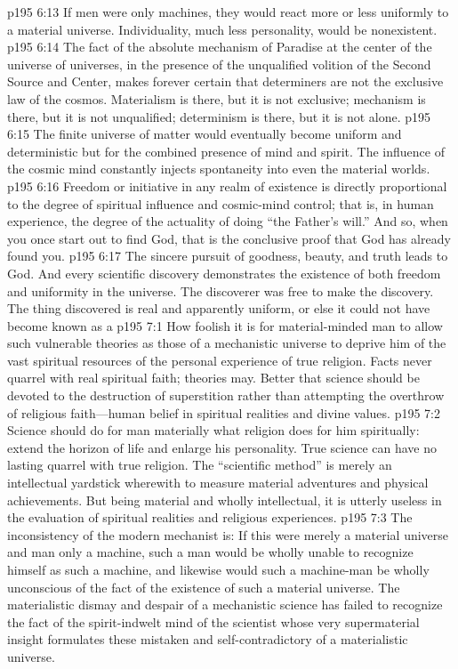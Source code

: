 \vs p195 6:13 If men were only machines, they would react more or less uniformly to a material universe. Individuality, much less personality, would be nonexistent.
\pc \vs p195 6:14 The fact of the absolute mechanism of Paradise at the center of the universe of universes, in the presence of the unqualified volition of the Second Source and Center, makes forever certain that determiners are not the exclusive law of the cosmos. Materialism is there, but it is not exclusive; mechanism is there, but it is not unqualified; determinism is there, but it is not alone.
\vs p195 6:15 The finite universe of matter would eventually become uniform and deterministic but for the combined presence of mind and spirit. The influence of the cosmic mind constantly injects spontaneity into even the material worlds.
\vs p195 6:16 Freedom or initiative in any realm of existence is directly proportional to the degree of spiritual influence and cosmic\hyp{}mind control; that is, in human experience, the degree of the actuality of doing “the Father’s will.” And so, when you once start out to find God, that is the conclusive proof that God has already found you.
\vs p195 6:17 The sincere pursuit of goodness, beauty, and truth leads to God. And every scientific discovery demonstrates the existence of both freedom and uniformity in the universe. The discoverer was free to make the discovery. The thing discovered is real and apparently uniform, or else it could not have become known as a 
\vs p195 7:1 How foolish it is for material\hyp{}minded man to allow such vulnerable theories as those of a mechanistic universe to deprive him of the vast spiritual resources of the personal experience of true religion. Facts never quarrel with real spiritual faith; theories may. Better that science should be devoted to the destruction of superstition rather than attempting the overthrow of religious faith---human belief in spiritual realities and divine values.
\vs p195 7:2 Science should do for man materially what religion does for him spiritually: extend the horizon of life and enlarge his personality. True science can have no lasting quarrel with true religion. The “scientific method” is merely an intellectual yardstick wherewith to measure material adventures and physical achievements. But being material and wholly intellectual, it is utterly useless in the evaluation of spiritual realities and religious experiences.
\vs p195 7:3 The inconsistency of the modern mechanist is: If this were merely a material universe and man only a machine, such a man would be wholly unable to recognize himself as such a machine, and likewise would such a machine\hyp{}man be wholly unconscious of the fact of the existence of such a material universe. The materialistic dismay and despair of a mechanistic science has failed to recognize the fact of the spirit\hyp{}indwelt mind of the scientist whose very supermaterial insight formulates these mistaken and self\hyp{}contradictory  of a materialistic universe.
